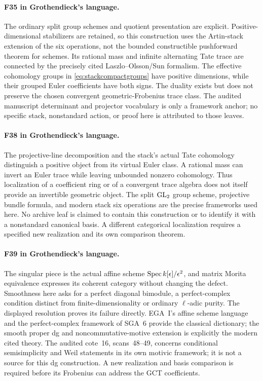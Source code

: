 \documentclass[11pt,a4paper]{article}
\newcommand{\fid}[1]{\textsf{#1}}\newcommand{\gate}[1]{\textsf{#1}}
\theoremstyle{named}\newtheorem{finding}{Finding}[section]
\theoremstyle{definition}\newtheorem{definition}[finding]{Definition}
\theoremstyle{remark}\newtheorem{remark}[finding]{Remark}
\begin{document}
\paragraph{\fid{F35} in Grothendieck's language.}
The ordinary split group schemes and quotient presentation are
explicit. Positive-dimensional stabilizers are retained, so this
construction uses the Artin-stack extension of the six operations,
not the bounded constructible pushforward theorem for schemes.
Its rational mass and infinite alternating Tate trace are connected
by the precisely cited Laszlo--Olsson/Sun formalism. The effective
cohomology groups in \eqref{eq:stackcompactgroups} have positive
dimensions, while their grouped Euler coefficients have both signs.
The duality exists but does not preserve the chosen convergent
geometric-Frobenius trace class. The audited manuscript determinant
and projector vocabulary is only a framework anchor; no specific
stack, nonstandard action, or proof here is attributed to those leaves.

\paragraph{\fid{F38} in Grothendieck's language.}
The projective-line decomposition and the stack's actual Tate
cohomology distinguish a positive object from its virtual Euler
class. A rational mass can invert an Euler trace while leaving
unbounded nonzero cohomology. Thus localization of a coefficient
ring or of a convergent trace algebra does not itself provide an
invertible geometric object. The split $\mathrm{GL}_2$ group scheme,
projective bundle formula, and modern stack six operations are
the precise frameworks used here. No archive leaf is claimed to
contain this construction or to identify it with a nonstandard
canonical basis. A different categorical localization requires a
specified new realization and its own comparison theorem.

\paragraph{\fid{F39} in Grothendieck's language.}
The singular piece is the actual affine scheme
$\operatorname{Spec} k[\epsilon]/\epsilon^2$, and matrix Morita equivalence
expresses its coherent category without changing the defect.
Smoothness here asks for a perfect diagonal bimodule, a perfect-complex
condition distinct from finite-dimensionality or ordinary $\ell$-adic
purity. The displayed resolution proves its failure directly. EGA~I's
affine scheme language and the perfect-complex framework of SGA~6
provide the classical dictionary; the smooth proper dg and
noncommutative-motive extension is explicitly the modern cited theory.
The audited cote~16, scans~48--49, concerns conditional semisimplicity
and Weil statements in its own motivic framework; it is not a source
for this dg construction. A new realization and basis comparison is
required before its Frobenius can address the GCT coefficients.
\end{document}
